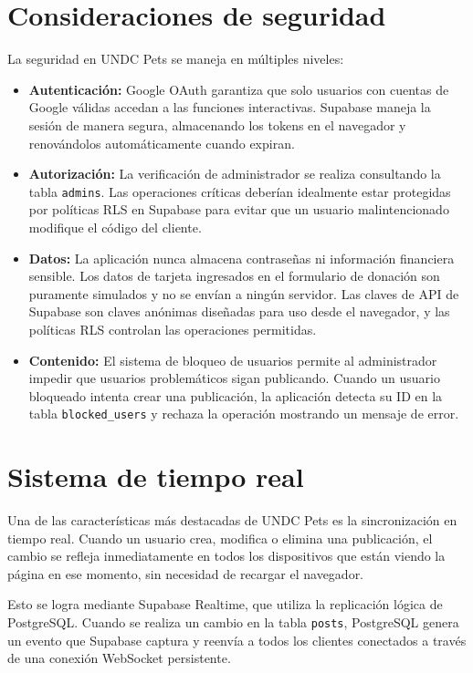 \documentclass[12pt,a4paper]{article}
\begin{document}
\section{Consideraciones de seguridad}

La seguridad en UNDC Pets se maneja en múltiples niveles:

\begin{itemize}
    \item \textbf{Autenticación:} Google OAuth garantiza que solo usuarios con cuentas de Google válidas accedan a las funciones interactivas. Supabase maneja la sesión de manera segura, almacenando los tokens en el navegador y renovándolos automáticamente cuando expiran.
    \item \textbf{Autorización:} La verificación de administrador se realiza consultando la tabla \texttt{admins}. Las operaciones críticas deberían idealmente estar protegidas por políticas RLS en Supabase para evitar que un usuario malintencionado modifique el código del cliente.
    \item \textbf{Datos:} La aplicación nunca almacena contraseñas ni información financiera sensible. Los datos de tarjeta ingresados en el formulario de donación son puramente simulados y no se envían a ningún servidor. Las claves de API de Supabase son claves anónimas diseñadas para uso desde el navegador, y las políticas RLS controlan las operaciones permitidas.
    \item \textbf{Contenido:} El sistema de bloqueo de usuarios permite al administrador impedir que usuarios problemáticos sigan publicando. Cuando un usuario bloqueado intenta crear una publicación, la aplicación detecta su ID en la tabla \texttt{blocked\_users} y rechaza la operación mostrando un mensaje de error.
\end{itemize}

\section{Sistema de tiempo real}

Una de las características más destacadas de UNDC Pets es la sincronización en tiempo real. Cuando un usuario crea, modifica o elimina una publicación, el cambio se refleja inmediatamente en todos los dispositivos que están viendo la página en ese momento, sin necesidad de recargar el navegador.

Esto se logra mediante Supabase Realtime, que utiliza la replicación lógica de PostgreSQL. Cuando se realiza un cambio en la tabla \texttt{posts}, PostgreSQL genera un evento que Supabase captura y reenvía a todos los clientes conectados a través de una conexión WebSocket persistente.
\end{document}
